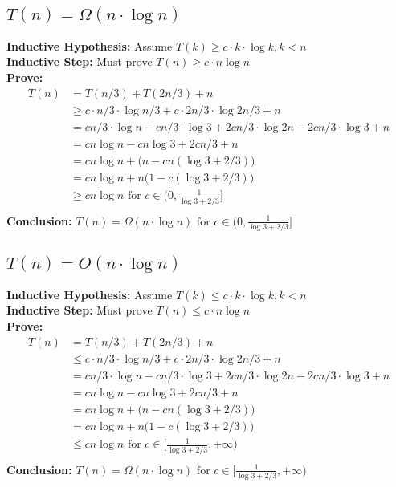 \documentclass[a4paper]{article}
\begin{document}
\subsection{$T(n)= \Omega(n\cdot \log n)$}

\textbf{Inductive Hypothesis:} Assume $T(k)\geq c\cdot k \cdot \log{k}, k< n$\\
\textbf{Inductive Step:} Must prove $T(n)\geq c\cdot n\log{n}$\\
\textbf{Prove:}\\
\begin{align*}
    T(n) & = T(n/3) + T(2n/3) + n \\
    & \geq c\cdot n/3 \cdot \log{n/3} + c\cdot 2n/3 \cdot \log{2n/3} +n \\ 
    & = cn/3 \cdot \log{n} - cn/3 \cdot \log{3} + 2cn/3 \cdot \log{2n} - 2cn/3 \cdot \log{3} +n \\
    & = cn \log n - cn\log 3 + 2cn/3 + n \\
    & = cn \log n +\bigl(n-cn(\log 3 + 2/3)\bigr) \\
    & = cn \log n +n\bigl(1-c(\log 3 + 2/3)\bigr) \\
    & \geq cn \log n \text{ for } c\in (0,\frac{1}{\log 3 + 2/3}]\\
\end{align*}
\textbf{Conclusion: }$T(n)= \Omega(n\cdot \log n)\text{ for } c\in (0,\frac{1}{\log 3 + 2/3}] $

\subsection{$T(n)= O(n\cdot \log n)$}

\textbf{Inductive Hypothesis:} Assume $T(k)\leq c\cdot k \cdot \log{k}, k< n$\\
\textbf{Inductive Step:} Must prove $T(n)\leq c\cdot n\log{n}$\\
\textbf{Prove:}\\
\begin{align*}
    T(n) & = T(n/3) + T(2n/3) + n \\
    & \leq c\cdot n/3 \cdot \log{n/3} + c\cdot 2n/3 \cdot \log{2n/3} +n \\ 
    & = cn/3 \cdot \log{n} - cn/3 \cdot \log{3} + 2cn/3 \cdot \log{2n} - 2cn/3 \cdot \log{3} +n \\
    & = cn \log n - cn\log 3 + 2cn/3 + n \\
    & = cn \log n +\bigl(n-cn(\log 3 + 2/3)\bigr) \\
    & = cn \log n +n\bigl(1-c(\log 3 + 2/3)\bigr) \\
    & \leq cn \log n \text{ for } c\in [\frac{1}{\log 3 + 2/3}, +\infty)\\
\end{align*}
\textbf{Conclusion: }$T(n)= \Omega(n\cdot \log n)\text{ for } c\in [\frac{1}{\log 3 + 2/3}, +\infty) $
\end{document}
